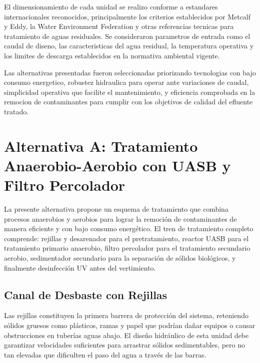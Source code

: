 \documentclass[12pt,a4paper]{article}
\begin{document}
El dimensionamiento de cada unidad se realizo conforme a estandares 
internacionales reconocidos, principalmente los criterios establecidos por 
Metcalf y Eddy, la Water Environment Federation y otras referencias tecnicas 
para tratamiento de aguas residuales. Se consideraron parametros de entrada 
como el caudal de diseno, las caracteristicas del agua residual, la temperatura 
operativa y los limites de descarga establecidos en la normativa ambiental 
vigente.

Las alternativas presentadas fueron seleccionadas priorizando tecnologias 
con bajo consumo energetico, robustez hidraulica para operar ante variaciones 
de caudal, simplicidad operativa que facilite el mantenimiento, y eficiencia 
comprobada en la remocion de contaminantes para cumplir con los objetivos de 
calidad del efluente tratado.


\newpage
\section{Alternativa A: Tratamiento Anaerobio-Aerobio con UASB y Filtro Percolador}

La presente alternativa propone un esquema de tratamiento que combina procesos anaerobios y aerobios para lograr la remoción de contaminantes de manera eficiente y con bajo consumo energético. El tren de tratamiento completo comprende: rejillas y desarenador para el pretratamiento, reactor UASB para el tratamiento primario anaerobio, filtro percolador para el tratamiento secundario aerobio, sedimentador secundario para la separación de sólidos biológicos, y finalmente desinfección UV antes del vertimiento.

\subsection{Canal de Desbaste con Rejillas}

Las rejillas constituyen la primera barrera de protección del sistema, reteniendo sólidos gruesos como plásticos, ramas y papel que podrían dañar equipos o causar obstrucciones en tuberías aguas abajo. El diseño hidráulico de esta unidad debe garantizar velocidades suficientes para arrastrar sólidos sedimentables, pero no tan elevadas que dificulten el paso del agua a través de las barras.
\end{document}
